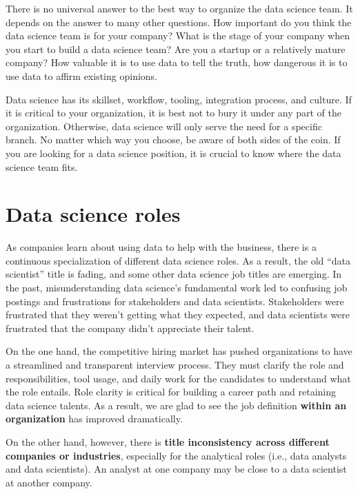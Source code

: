 \documentclass[
  12pt,
]{krantz}
\begin{document}
There is no universal answer to the best way to organize the data science team. It depends on the answer to many other questions. How important do you think the data science team is for your company? What is the stage of your company when you start to build a data science team? Are you a startup or a relatively mature company? How valuable it is to use data to tell the truth, how dangerous it is to use data to affirm existing opinions.

Data science has its skillset, workflow, tooling, integration process, and culture. If it is critical to your organization, it is best not to bury it under any part of the organization. Otherwise, data science will only serve the need for a specific branch. No matter which way you choose, be aware of both sides of the coin. If you are looking for a data science position, it is crucial to know where the data science team fits.

\hypertarget{data-science-roles}{%
\section{Data science roles}\label{data-science-roles}}

As companies learn about using data to help with the business, there is a continuous specialization of different data science roles. As a result, the old ``data scientist'' title is fading, and some other data science job titles are emerging. In the past, misunderstanding data science's fundamental work led to confusing job postings and frustrations for stakeholders and data scientists. Stakeholders were frustrated that they weren't getting what they expected, and data scientists were frustrated that the company didn't appreciate their talent.

On the one hand, the competitive hiring market has pushed organizations to have a streamlined and transparent interview process. They must clarify the role and responsibilities, tool usage, and daily work for the candidates to understand what the role entails. Role clarity is critical for building a career path and retaining data science talents. As a result, we are glad to see the job definition \textbf{within an organization} has improved dramatically.

On the other hand, however, there is \textbf{title inconsistency across different companies or industries}, especially for the analytical roles (i.e., data analysts and data scientists). An analyst at one company may be close to a data scientist at another company.
\end{document}
